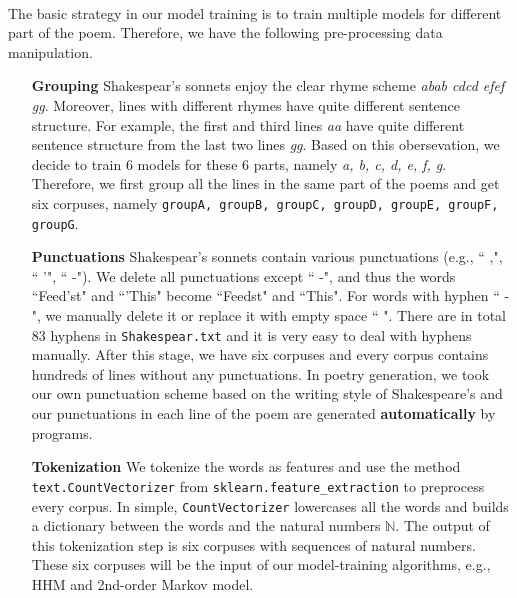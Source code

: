%
\vspace{5pt}
\paragraph{}
The basic strategy in our model training is to train multiple models for different part of the poem. Therefore, we have the following pre-processing data manipulation.

\begin{enumerate}
	\item [\textbf{Grouping}] Shakespear's sonnets enjoy the clear rhyme scheme \textit{abab cdcd efef gg}. Moreover, lines with different rhymes have quite different sentence structure. For example, the first and third lines \textit{aa} have quite different sentence structure from the last two lines \textit{gg}. Based on this obersevation, we decide to train 6 models for these 6 parts, namely \textit{a, b, c, d, e, f, g}. Therefore, we first group all the lines in the same part of the poems and get six corpuses, namely \texttt{groupA, groupB, groupC, groupD, groupE, groupF, groupG}.
	\item [\textbf{Punctuations}] Shakespear's sonnets contain various punctuations (e.g., `` ,", `` '", `` -"). We delete all punctuations except `` -", and thus the words ``Feed'st" and ``'This" become ``Feedst" and ``This". For words with hyphen `` -", we manually delete it or replace it with empty space ``  ". There are in total 83 hyphens in \texttt{Shakespear.txt} and it is very easy to deal with hyphens manually. After this stage, we have six corpuses and every corpus contains hundreds of lines without any punctuations. In poetry generation, we took our own punctuation scheme based on the writing style of Shakespeare's and our punctuations in each line of the poem are generated \textbf{automatically} by programs. 
	\item [\textbf{Tokenization}] We tokenize the words as features and use the method \texttt{text.CountVectorizer} from \texttt{sklearn.feature\_extraction} to preprocess every corpus. In simple, \texttt{CountVectorizer} lowercases all the words and builds a dictionary between the words and the natural numbers $\mathbb{N}$. The output of this tokenization step is six corpuses with sequences of natural numbers. These six corpuses will be the input of our model-training algorithms, e.g., HHM and 2nd-order Markov model.
\end{enumerate}

